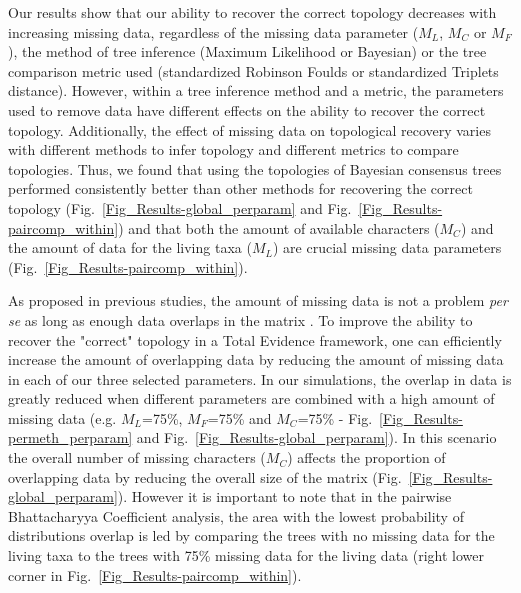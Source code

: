 \documentclass[12pt,letterpaper]{article}
\begin{document}
Our results show that our ability to recover the correct topology decreases with increasing missing data, regardless of the missing data parameter ($M_{L}$, $M_{C}$ or $M_{F}$), the method of tree inference (Maximum Likelihood or Bayesian) or the tree comparison metric used (standardized Robinson Foulds or standardized Triplets distance). 
However, within a tree inference method and a metric, the parameters used to remove data have different effects on the ability to recover the correct topology.
Additionally, the effect of missing data on topological recovery varies with different methods to infer topology and different metrics to compare topologies.
Thus, we found that using the topologies of Bayesian consensus trees performed consistently better than other methods for recovering the correct topology (Fig.~\ref{Fig_Results-global_perparam} and Fig.~\ref{Fig_Results-paircomp_within}) and that both the amount of available characters ($M_{C}$) and the amount of data for the living taxa ($M_{L}$) are crucial missing data parameters (Fig.~\ref{Fig_Results-paircomp_within}).


As proposed in previous studies, the amount of missing data is not a problem \textit{per se} as long as enough data overlaps in the matrix \citep[e.g.][]{kearneyfragmentary2002,wiensmissing2003,rouresite-specific2011,pattinsonphylogeny2014}. %
To improve the ability to recover the "correct" topology in a Total Evidence framework, one can efficiently increase the amount of overlapping data by reducing the amount of missing data in each of our three selected parameters. In our simulations, the overlap in data is greatly reduced when different parameters are combined with a high amount of missing data (e.g. $M_{L}$=75\%, $M_{F}$=75\% and $M_{C}$=75\% - Fig.~\ref{Fig_Results-permeth_perparam} and Fig.~\ref{Fig_Results-global_perparam}). In this scenario the overall number of missing characters ($M_{C}$) affects the proportion of overlapping data by reducing the overall size of the matrix (Fig.~\ref{Fig_Results-global_perparam}). However it is important to note that in the pairwise Bhattacharyya Coefficient analysis, the area with the lowest probability of distributions overlap is led by comparing the trees with no missing data for the living taxa to the trees with 75\% missing data for the living data (right lower corner in Fig.~\ref{Fig_Results-paircomp_within}).
\end{document}
